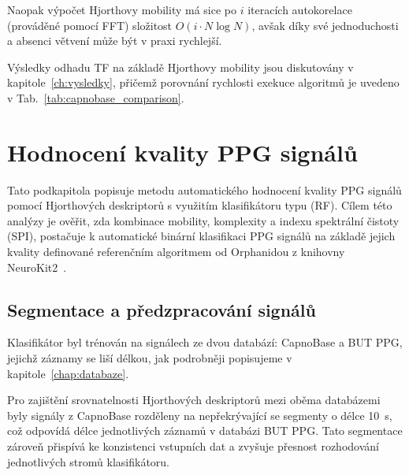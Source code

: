 Naopak výpočet Hjorthovy mobility má sice po \( i \) iteracích autokorelace (prováděné pomocí \acs{FFT}) složitost \( O(i \cdot N \log N) \), avšak díky své jednoduchosti a absenci větvení může být v praxi rychlejší.

Výsledky odhadu \acs{TF} na základě Hjorthovy mobility jsou diskutovány v kapitole~\ref{ch:vysledky}, přičemž porovnání rychlosti exekuce algoritmů je uvedeno v Tab.~\ref{tab:capnobase_comparison}. %

\section{Hodnocení kvality PPG signálů}
\label{sec:hjorth_kvalita}
Tato podkapitola popisuje metodu automatického hodnocení kvality \acs{PPG} signálů pomocí Hjorthových deskriptorů s využitím klasifikátoru typu  (\acs{RF}).
Cílem této analýzy je ověřit, zda kombinace mobility, komplexity a indexu spektrální čistoty (\acs{SPI}), postačuje k automatické binární klasifikaci \acs{PPG} signálů na základě jejich kvality definované referenčním algoritmem od Orphanidou z knihovny NeuroKit2~\cite{NeuroKit2}.

\subsection*{Segmentace a předzpracování signálů}
\label{subsec:segmentace_predzpracovani}
Klasifikátor byl trénován na signálech ze dvou databází: CapnoBase a \acs{BUT PPG}, jejichž záznamy se liší délkou, jak podrobněji popisujeme v kapitole~\ref{chap:databaze}.

Pro zajištění srovnatelnosti Hjorthových deskriptorů mezi oběma databázemi byly signály z CapnoBase rozděleny na nepřekrývající se segmenty o délce 10~s, což odpovídá délce jednotlivých záznamů v databázi \acs{BUT PPG}.
Tato segmentace zároveň přispívá ke konzistenci vstupních dat a zvyšuje přesnost rozhodování jednotlivých stromů klasifikátoru.

